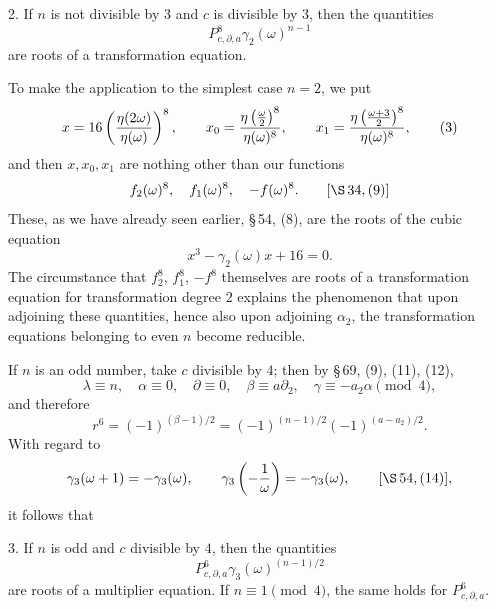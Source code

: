 \documentclass[11pt]{article}
\begin{document}
2. If $n$ is not divisible by $3$ and $c$ is divisible by $3$, then the quantities
\[
 P_{c,\partial,a}^{8}\gamma_2(\omega)^{n-1}
\]
are roots of a transformation equation.

To make the application to the simplest case $n=2$, we put
\begin{equation}
 x=16\left({\eta(2\omega)\over\eta(\omega)}\right)^8,
 \qquad
 x_0={\eta\left({\omega\over2}\right)^8\over\eta(\omega)^8},
 \qquad
 x_1={\eta\left({\omega+3\over2}\right)^8\over\eta(\omega)^8},
\tag{3}
\end{equation}
and then $x,x_0,x_1$ are nothing other than our functions
\[
 f_2(\omega)^8,
 \quad f_1(\omega)^8,
 \quad -f(\omega)^8.
 \qquad [\S\,34,(9)]
\]
These, as we have already seen earlier, \S\,54, (8), are the roots of the cubic equation
\begin{equation}
 x^3-\gamma_2(\omega)x+16=0.
\tag{4}
\end{equation}
The circumstance that $f_2^8$, $f_1^8$, $-f^8$ themselves are roots of a transformation equation for transformation degree $2$ explains the phenomenon that upon adjoining these quantities, hence also upon adjoining $\alpha_2$, the transformation equations belonging to even $n$ become reducible.

If $n$ is an odd number, take $c$ divisible by $4$; then by \S\,69, (9), (11), (12),
\[
 \lambda\equiv n,\quad \alpha\equiv0,
 \quad \partial\equiv0,
 \quad \beta\equiv a\partial_2,
 \quad \gamma\equiv-a_2\alpha
 \pmod4,
\]
and therefore
\[
 r^6=(-1)^{(\beta-1)/2}=(-1)^{(n-1)/2}(-1)^{(a-a_2)/2}.
\]
With regard to
\[
 \gamma_3(\omega+1)=-\gamma_3(\omega),
 \qquad
 \gamma_3\left(-{1\over\omega}\right)=-\gamma_3(\omega),
 \qquad [\S\,54,(14)],
\]
it follows that

3. If $n$ is odd and $c$ divisible by $4$, then the quantities
\[
 P_{c,\partial,a}^{6}\gamma_3(\omega)^{(n-1)/2}
\]
are roots of a multiplier equation. If $n\equiv1\pmod4$, the same holds for $P_{c,\partial,a}^{6}$.
\end{document}
